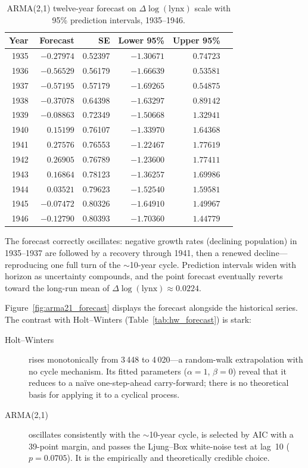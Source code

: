 \documentclass[12pt,a4paper]{article}
\begin{document}
\begin{table}[H]
\centering
\caption{ARMA(2,1) twelve-year forecast on $\Delta\log(\text{lynx})$ scale
with 95\% prediction intervals, 1935--1946.}
\label{tab:forecast}
\begin{tabular}{rrrrrr}
\toprule
Year & Forecast & SE & Lower 95\% & Upper 95\% \\
\midrule
1935 & $-0.27974$ & 0.52397 & $-1.30671$ & $\phantom{-}0.74723$ \\
1936 & $-0.56529$ & 0.56179 & $-1.66639$ & $\phantom{-}0.53581$ \\
1937 & $-0.57195$ & 0.57179 & $-1.69265$ & $\phantom{-}0.54875$ \\
1938 & $-0.37078$ & 0.64398 & $-1.63297$ & $\phantom{-}0.89142$ \\
1939 & $-0.08863$ & 0.72349 & $-1.50668$ & $\phantom{-}1.32941$ \\
1940 & $\phantom{-}0.15199$ & 0.76107 & $-1.33970$ & $\phantom{-}1.64368$ \\
1941 & $\phantom{-}0.27576$ & 0.76553 & $-1.22467$ & $\phantom{-}1.77619$ \\
1942 & $\phantom{-}0.26905$ & 0.76789 & $-1.23600$ & $\phantom{-}1.77411$ \\
1943 & $\phantom{-}0.16864$ & 0.78123 & $-1.36257$ & $\phantom{-}1.69986$ \\
1944 & $\phantom{-}0.03521$ & 0.79623 & $-1.52540$ & $\phantom{-}1.59581$ \\
1945 & $-0.07472$ & 0.80326 & $-1.64910$ & $\phantom{-}1.49967$ \\
1946 & $-0.12790$ & 0.80393 & $-1.70360$ & $\phantom{-}1.44779$ \\
\bottomrule
\end{tabular}
\end{table}

The forecast correctly oscillates: negative growth rates (declining population) in
1935--1937 are followed by a recovery through 1941, then a renewed decline---
reproducing one full turn of the $\sim$10-year cycle. Prediction intervals widen with
horizon as uncertainty compounds, and the point forecast eventually reverts toward the
long-run mean of $\Delta\log(\text{lynx}) \approx 0.0224$.

Figure~\ref{fig:arma21_forecast} displays the forecast alongside the historical
series. The contrast with Holt--Winters (Table~\ref{tab:hw_forecast}) is stark:

\begin{description}
  \item[Holt--Winters] rises monotonically from 3\,448 to 4\,020---a random-walk
  extrapolation with no cycle mechanism. Its fitted parameters ($\alpha = 1$,
  $\beta = 0$) reveal that it reduces to a na\"ive one-step-ahead carry-forward;
  there is no theoretical basis for applying it to a cyclical process.

  \item[ARMA(2,1)] oscillates consistently with the $\sim$10-year cycle, is selected
  by AIC with a 39-point margin, and passes the Ljung--Box white-noise test at
  lag~10 ($p = 0.0705$). It is the empirically and theoretically credible choice.
\end{description}
\end{document}
